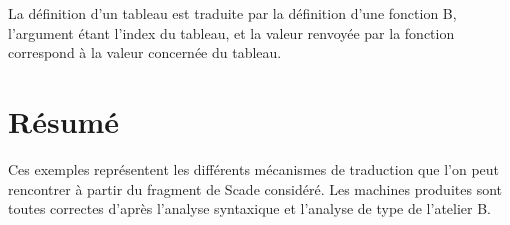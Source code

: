 La définition d'un tableau est traduite par la définition d'une fonction B,
l'argument étant l'index du tableau, et la valeur renvoyée par la fonction correspond à la
valeur concernée du tableau.

\section*{Résumé}
Ces exemples représentent les différents mécanismes de traduction que l'on peut
rencontrer à partir du fragment de Scade considéré. Les machines produites sont
toutes correctes d'après l'analyse syntaxique et l'analyse de type de l'atelier B.
